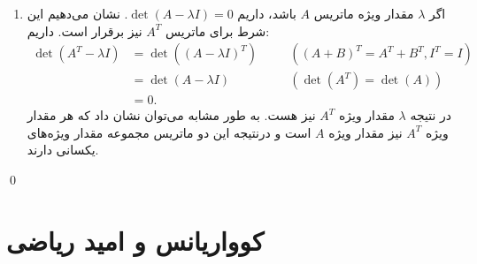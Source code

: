 \documentclass[a4paper, 11pt]{article}
\begin{document}
\begin{enumerate}[1.]
	\item
	اگر $\lambda$ مقدار ویژه ماتریس $A$ باشد، داریم 
	$\det(A - \lambda I) = 0$.
	نشان می‌دهیم این شرط برای ماتریس 
	$A^T$
	نیز برقرار است. داریم:
	\[
	\begin{aligned}
		\det(A^T - \lambda I)	&= \det\left((A - \lambda I)^T\right) &&\quad ((A + B)^T = A^T + B^T, I^T = I) \\
								&= \det(A - \lambda I) &&\quad (\det(A^T) = \det(A))\\
								&= 0.
	\end{aligned}
	\]
	در نتیجه $\lambda$ مقدار ویژه $A^T$ نیز هست. به طور مشابه می‌توان نشان داد که هر مقدار ویژه $A^T$ نیز مقدار ویژه $A$ است و درنتیجه این دو ماتریس مجموعه مقدار ویژه‌های یکسانی دارند.
\end{enumerate}
\qed

\section{کوواریانس و امید ریاضی}
\end{document}

